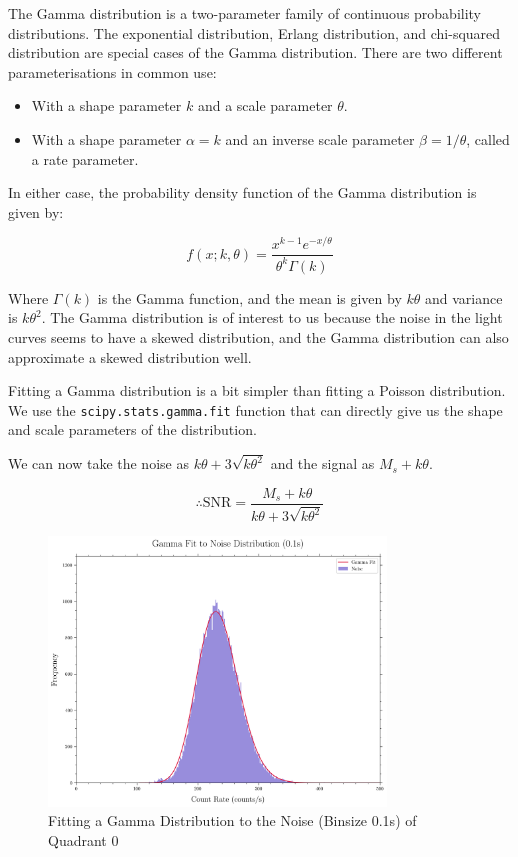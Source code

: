 \documentclass[11pt]{book} %
\begin{document}
The Gamma distribution is a two-parameter family of continuous probability distributions. The exponential distribution, Erlang distribution, and chi-squared distribution are special cases of the Gamma distribution. There are two different parameterisations in common use:

\begin{itemize}
    \item With a shape parameter $k$ and a scale parameter $\theta$.
    \item With a shape parameter $\alpha = k$ and an inverse scale parameter $\beta = 1/\theta$, called a rate parameter.
\end{itemize}

In either case, the probability density function of the Gamma distribution is given by:

\begin{equation} \label{eq:Gamma}
    f(x; k, \theta) = \frac{x^{k-1}e^{-x/\theta}}{\theta^k\Gamma(k)}
\end{equation}
    
    Where $\Gamma(k)$ is the Gamma function, and the mean is given by $k\theta$ and variance is $k\theta^2$. The Gamma distribution is of interest to us because the noise in the light curves seems to have a skewed distribution, and the Gamma distribution can also approximate a skewed distribution well.

Fitting a Gamma distribution is a bit simpler than fitting a Poisson distribution. We use the \lstinline[language=Python]{scipy.stats.gamma.fit} function that can directly give us the shape and scale parameters of the distribution.

We can now take the noise as $k\theta + 3\sqrt{k\theta^2}$ and the signal as $M_s+k\theta$.

\begin{equation}
    \therefore \text{SNR} = \frac{M_s+k\theta}{k\theta + 3\sqrt{k\theta^2}}
\end{equation}

\begin{figure}[H]
    \centering
    \includegraphics[width=0.8\textwidth]{Pictures/gamma_fit.png}
    \caption{Fitting a Gamma Distribution to the Noise (Binsize 0.1s) of Quadrant 0}
\end{figure}
\end{document}
